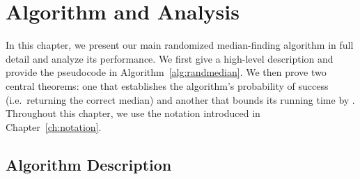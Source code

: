 \chapter{Algorithm and Analysis}
\label{ch:analysis}



In this chapter, we present our main randomized median-finding algorithm in full detail and analyze its performance. We first give a high-level description and provide the pseudocode in Algorithm~\ref{alg:randmedian}. We then prove two central theorems: one that establishes the algorithm’s probability of success (i.e.\ returning the correct median) and another that bounds its running time by . Throughout this chapter, we use the notation introduced in Chapter~\ref{ch:notation}.
\section*{Algorithm Description}

